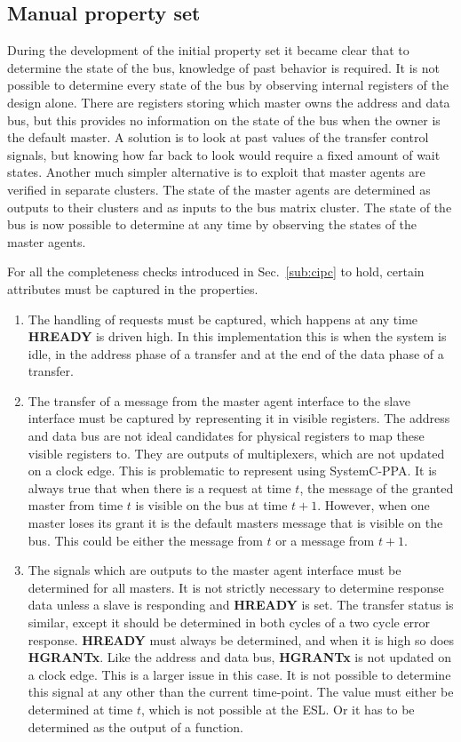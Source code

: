 \subsection{Manual property set}
During the development of the initial property set it became clear that to determine the state of the bus, knowledge of past behavior is required. It is not possible to determine every state of the bus by observing internal registers of the design alone. There are registers storing which master owns the address and data bus, but this provides no information on the state of the bus when the owner is the default master. A solution is to look at past values of the transfer  control signals, but knowing how far back to look would require a fixed amount of wait states. Another much simpler alternative is to exploit that master agents are verified in separate clusters. The state of the master agents are determined as outputs to their clusters and as inputs to the bus matrix cluster. The state of the bus is now possible to determine at any time by observing the states of the master agents. \par
For all the completeness checks introduced in Sec.~\ref{sub:cipc} to hold, certain attributes must be captured in the properties. 
\begin{enumerate}
 \item The handling of requests must be captured, which happens at any time \textbf{HREADY} is driven high. In this implementation this is when the system is idle, in the address phase of a transfer and at the end of the data phase of a transfer.
 \item The transfer of a message from the master agent interface to the slave interface must be captured by representing it in visible registers. The address and data bus are not ideal candidates for physical registers to map these visible registers to. They are outputs of multiplexers, which are not updated on a clock edge. This is problematic to represent using SystemC-PPA. It is always true that when there is a request at time $t$, the message of the granted master from time $t$ is visible on the bus at time $t+1$. However, when one master loses its grant it is the default masters message that is visible on the bus. This could be either the message from $t$ or a message from $t+1$.  
 \item The signals which are outputs to the master agent interface must be determined for all masters. It is not strictly necessary to determine response data unless a slave is responding and \textbf{HREADY} is set. The transfer status is similar, except it should be determined in both cycles of a two cycle error response. \textbf{HREADY} must always be determined, and when it is high so does \textbf{HGRANTx}. Like the address and data bus, \textbf{HGRANTx} is not updated on a clock edge. This is a larger issue in this case. It is not possible to determine this signal at any other than the current time-point. The value must either be determined at time $t$, which is not possible at the ESL. Or it has to be determined as the output of a function. 
\end{enumerate} 

